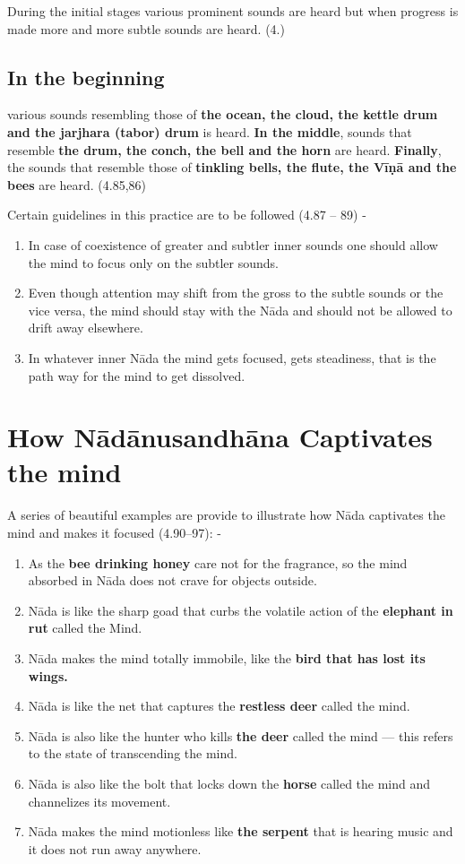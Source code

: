 During the initial stages various prominent sounds are heard but when progress is made more and more subtle sounds are heard. (4.) 

\subsection*{In the beginning}

 various sounds resembling those of \textbf{the ocean, the cloud, the kettle drum and the jarjhara (tabor) drum} is heard. \textbf{In the middle}, sounds that resemble \textbf{the drum, the conch, the bell and the horn} are heard. \textbf{Finally}, the sounds that resemble those of \textbf{tinkling bells, the flute, the Vīṇā and the bees} are heard. (4.85,86) 

Certain guidelines in this practice are to be followed (4.87 -- 89) -

\begin{enumerate}
\itemsep=0pt
\item In case of coexistence of greater and subtler inner sounds one should allow the mind to focus only on the subtler sounds. 
\item Even though attention may shift from the gross to the subtle sounds or the vice versa, the mind should stay with the Nāda and should not be allowed to drift away elsewhere.
\item In whatever inner Nāda the mind gets focused, gets steadiness, that is the path way for the mind to get dissolved. 
\end{enumerate}

\section*{How Nādānusandhāna Captivates the mind}

A series of beautiful examples are provide to illustrate how Nāda captivates the mind and makes it focused (4.90--97): -

\begin{enumerate}
\itemsep=0pt
\item As the \textbf{bee drinking honey} care not for the fragrance, so the mind absorbed in Nāda does not crave for objects outside.
\item Nāda is like the sharp goad that curbs the volatile action of the \textbf{elephant in rut} called the Mind.
\item Nāda makes the mind totally immobile, like the \textbf{bird that has lost its wings.}
\item Nāda is like the net that captures the \textbf{restless deer} called the mind.
\item Nāda is also like the hunter who kills \textbf{the deer} called the mind --- this refers to the state of transcending the mind. 
\item Nāda is also like the bolt that locks down the \textbf{horse} called the mind and channelizes its movement. 
\item Nāda makes the mind motionless like \textbf{the serpent} that is hearing music and it does not run away anywhere.
\end{enumerate}

